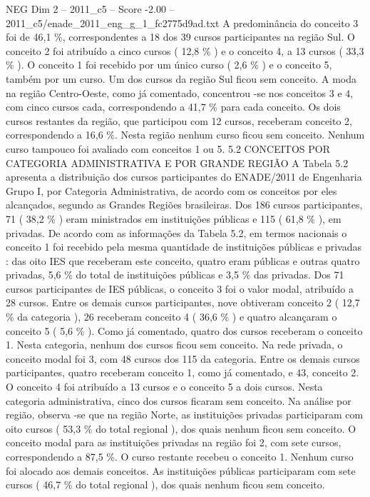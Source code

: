 \begin{textsample}{NEG Dim 2 – 2011\_c5 – Score -2.00 – 2011\_c5/enade\_2011\_eng\_g\_1\_fc2775d9ad.txt}
A predominância do conceito 3 foi de 46,1 \%, correspondentes a 18 dos 39 cursos participantes na região Sul.
O conceito 2 foi atribuído a cinco cursos ( 12,8 \% ) e o conceito 4, a 13 cursos ( 33,3 \% ).
O conceito 1 foi recebido por um único curso ( 2,6 \% ) e o conceito 5, também por um curso.
Um dos cursos da região Sul ficou sem conceito.
A moda na região Centro-Oeste, como já comentado, concentrou -se nos conceitos 3 e 4, com cinco cursos cada, correspondendo a 41,7 \% para cada conceito.
Os dois cursos restantes da região, que participou com 12 cursos, receberam conceito 2, correspondendo a 16,6 \%.
Nesta região nenhum curso ficou sem conceito.
Nenhum curso tampouco foi avaliado com conceitos 1 ou 5. 5.2 CONCEITOS POR CATEGORIA ADMINISTRATIVA E POR GRANDE REGIÃO A Tabela 5.2 apresenta a distribuição dos cursos participantes do ENADE/2011 de Engenharia Grupo I, por Categoria Administrativa, de acordo com os conceitos por eles alcançados, segundo as Grandes Regiões brasileiras.
Dos 186 cursos participantes, 71 ( 38,2 \% ) eram ministrados em instituições públicas e 115 ( 61,8 \% ), em privadas.
De acordo com as informações da Tabela 5.2, em termos nacionais o conceito 1 foi recebido pela mesma quantidade de instituições públicas e privadas : das oito IES que receberam este conceito, quatro eram públicas e outras quatro privadas, 5,6 \% do total de instituições públicas e 3,5 \% das privadas.
Dos 71 cursos participantes de IES públicas, o conceito 3 foi o valor modal, atribuído a 28 cursos.
Entre os demais cursos participantes, nove obtiveram conceito 2 ( 12,7 \% da categoria ), 26 receberam conceito 4 ( 36,6 \% ) e quatro alcançaram o conceito 5 ( 5,6 \% ).
Como já comentado, quatro dos cursos receberam o conceito 1.
Nesta categoria, nenhum dos cursos ficou sem conceito.
Na rede privada, o conceito modal foi 3, com 48 cursos dos 115 da categoria.
Entre os demais cursos participantes, quatro receberam conceito 1, como já comentado, e 43, conceito 2.
O conceito 4 foi atribuído a 13 cursos e o conceito 5 a dois cursos.
Nesta categoria administrativa, cinco dos cursos ficaram sem conceito.
Na análise por região, observa -se que na região Norte, as instituições privadas participaram com oito cursos ( 53,3 \% do total regional ), dos quais nenhum ficou sem conceito.
O conceito modal para as instituições privadas na região foi 2, com sete cursos, correspondendo a 87,5 \%.
O curso restante recebeu o conceito 1.
Nenhum curso foi alocado aos demais conceitos.
As instituições públicas participaram com sete cursos ( 46,7 \% do total regional ), dos quais nenhum ficou sem conceito.

\end{textsample}
